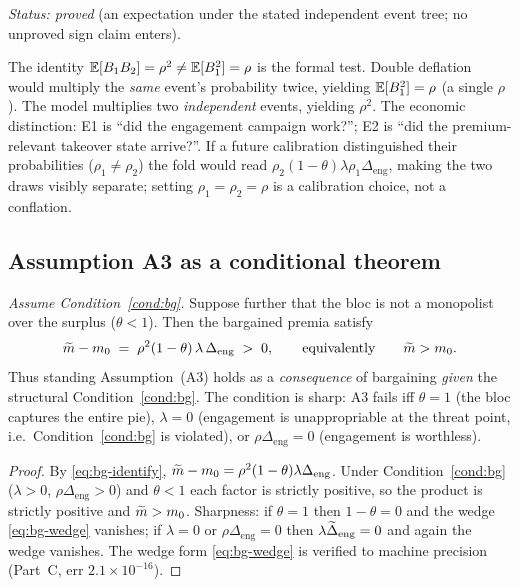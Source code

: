 \noindent\emph{Status: proved} (an expectation under the stated independent
event tree; no unproved sign claim enters).

\begin{remark}
\label{rem:bg-nodouble}
The identity $\mathbb{E}[B_{1}B_{2}]=\rho^{2}\ne\mathbb{E}[B_{1}^{2}]=\rho$ is the formal test.
Double deflation would multiply the \emph{same} event's probability twice,
yielding $\mathbb{E}[B_{1}^{2}]=\rho$ (a single $\rho$). The model multiplies two
\emph{independent} events, yielding $\rho^{2}$. The economic distinction: E1 is
``did the engagement campaign work?''; E2 is ``did the premium-relevant takeover
state arrive?''. If a future calibration distinguished their probabilities
($\rho_{1}\ne\rho_{2}$) the fold would read
$\rho_{2}(1-\theta)\lambda\rho_{1}\Delta_{\mathrm{eng}}$, making the two draws
visibly separate; setting $\rho_{1}=\rho_{2}=\rho$ is a calibration choice, not a
conflation.
\end{remark}

\subsection{Assumption A3 as a conditional theorem}
\label{app:bg-A3}

\begin{theorem}
\label{thm:bg-A3}
\emph{Assume Condition~\ref{cond:bg}.} Suppose further that the bloc is not a
monopolist over the surplus ($\theta<1$). Then the bargained premia satisfy
\[
  \widetilde{m}-m_{0}\;=\;\rho^{2}(1-\theta)\,\lambda\,\Delta_{\mathrm{eng}}\;>\;0,
  \qquad\text{equivalently}\qquad \widetilde{m}>m_{0}.
\]
Thus standing Assumption~\textup{(A3)} holds as a \emph{consequence} of bargaining
\emph{given} the structural Condition~\ref{cond:bg}. The condition is sharp: A3
fails iff $\theta=1$ (the bloc captures the entire pie), $\lambda=0$ (engagement
is unappropriable at the threat point, i.e.\ Condition~\ref{cond:bg} is violated),
or $\rho\Delta_{\mathrm{eng}}=0$ (engagement is worthless).
\end{theorem}

\begin{proof}
By \eqref{eq:bg-identify},
$\widetilde{m}-m_{0}=\rho^{2}(1-\theta)\lambda\Delta_{\mathrm{eng}}$. Under
Condition~\ref{cond:bg} ($\lambda>0$, $\rho\Delta_{\mathrm{eng}}>0$) and
$\theta<1$ each factor is strictly positive, so the product is strictly positive
and $\widetilde{m}>m_{0}$. Sharpness: if $\theta=1$ then $1-\theta=0$ and the wedge
\eqref{eq:bg-wedge} vanishes; if $\lambda=0$ or $\rho\Delta_{\mathrm{eng}}=0$ then
$\lambda\widetilde{\Delta}_{\mathrm{eng}}=0$ and again the wedge vanishes. The wedge form
\eqref{eq:bg-wedge} is verified to machine precision (Part~C, err
$2.1\times10^{-16}$).
\end{proof}

